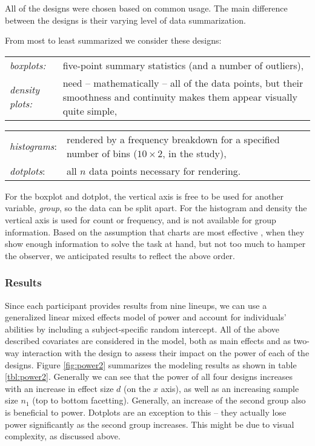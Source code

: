 All of the designs were chosen based on common usage. The main difference between the designs is their varying level of data summarization. 

 From most to least summarized we consider these designs:

\begin{tabular}{lp{}}\\[-5pt]
\em boxplots: & five-point summary statistics (and a number of  outliers),\\
\em density plots: & need -- mathematically -- all of the data points, but  their smoothness and continuity makes them appear visually quite simple,\\
\end{tabular}
\begin{tabular}{lp{}}
 {\em histograms}: &  rendered by a frequency breakdown for a specified number of bins ($10 \times 2$, in the study),\\
 {\em dotplots}: & all $n$ data points necessary for rendering.\\[3pt]
\end{tabular}

\noindent For the boxplot and dotplot, the vertical axis is free to be used for another variable, {\em group}, so the data can be split apart. For the histogram and density the vertical axis is used for count or frequency, and is not available for group information.
Based on the assumption that charts are most effective \citep{Kosslyn:2006}, when they show enough information to solve the task at hand, but not too much to hamper the observer, we anticipated results to reflect the above order. 


\subsubsection{Results}

Since each participant provides results from nine lineups, we can use a generalized linear mixed effects model of power and account for individuals' abilities by including a subject-specific random intercept. All of the above described covariates are considered  in the model, both as main effects and as two-way interaction with the design to assess their impact on the power of each of the designs.
Figure \ref{fig:power2} summarizes the modeling results as shown in table \ref{tbl:power2}. Generally we can see that the power of all four designs increases with an increase in effect size $d$ (on the $x$ axis), as well as an increasing sample size $n_1$ (top to bottom facetting). Generally, an increase of the second group also is beneficial to power. Dotplots are an exception to this -- they actually lose power significantly as the second group increases. This might be due to visual complexity, as discussed above.

